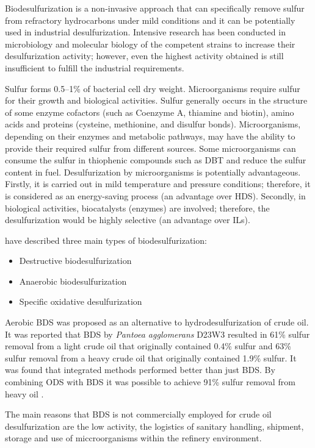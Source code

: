 Biodesulfurization is a non-invasive approach that can specifically remove sulfur from refractory hydrocarbons under mild conditions and it can be potentially used in industrial desulfurization. Intensive research has been
conducted in microbiology and molecular biology of the competent strains to increase their desulfurization activity; however, even the highest activity obtained is still insufficient to fulfill the industrial requirements. 

Sulfur forms 0.5--1\% of bacterial cell dry weight. Microorganisms require sulfur for their growth and biological activities. Sulfur generally occurs in the structure of some enzyme cofactors (such as Coenzyme A, thiamine and biotin), amino acids and proteins (cysteine, methionine, and disulfur bonds). Microorganisms, depending on their enzymes and metabolic pathways, may have the ability to provide their required sulfur from different sources. Some microorganisms can consume the sulfur in thiophenic compounds such as DBT and reduce the sulfur content in fuel. Desulfurization by microorganisms is potentially advantageous. Firstly, it is carried out in mild temperature and pressure conditions; therefore, it is considered as an energy-saving process (an advantage over HDS). Secondly, in biological activities, biocatalysts (enzymes) are involved; therefore, the desulfurization would be highly selective (an advantage over ILs).

\cite{Soleimani2007570} have described three main types of biodesulfurization:
\begin{itemize}
\item Destructive biodesulfurization
\item Anaerobic biodesulfurization
\item Specific oxidative desulfurization
\end{itemize}

Aerobic BDS was proposed as an alternative to hydrodesulfurization of crude oil. It was reported that BDS by \emph{Pantoea agglomerans} D23W3 resulted in 61\% sulfur removal from a light crude oil that originally contained 0.4\% sulfur and 63\% sulfur removal from a heavy crude oil that originally contained 1.9\% sulfur. It was found that integrated methods performed better than just BDS. By combining ODS with BDS it was possible to achieve 91\% sulfur removal from heavy oil \citep{agarwalsharma}.

The main reasons that BDS is not commercially employed for crude oil desulfurization are the low activity, the logistics of sanitary handling, shipment, storage and use of miccroorganisms within the refinery environment.


